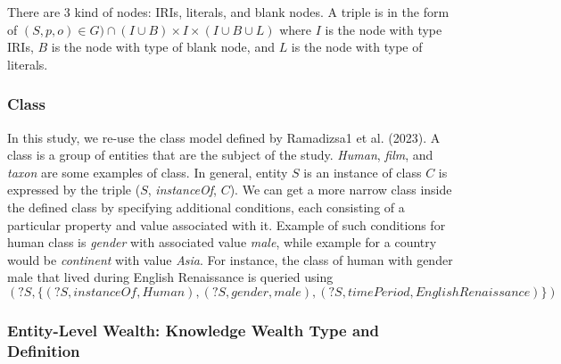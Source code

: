 \documentclass[
]{ceurart}
\begin{document}
There are 3 kind of nodes: IRIs, literals, and blank nodes. A triple is in the form of \((S, p, o) \in G) \cap (I \cup B) \times I \times (I \cup B \cup L) \) where \(I\) is the node with type IRIs, \(B\) is the node with type of blank node, and \(L\) is the node with type of literals.

\subsubsection{Class}
In this study, we re-use the class model defined by Ramadizsa1 et al. (2023). A class is a group of entities that are the subject of the study. \textit{Human}, \textit{film}, and \textit{taxon} are some examples of class. In general, entity \(S\) is an instance of class \(C\) is expressed by the triple (\(S\), \textit{instanceOf}, \(C\)). We can get a more narrow class inside the defined class by specifying additional conditions, each consisting of a particular property and value associated with it. Example of such conditions for human class is \textit{gender} with associated value \textit{male}, while example for a country would be \textit{continent} with value \textit{Asia}. For instance, the class of human with gender male that lived during English Renaissance is queried using
\[
    (?S, \{(?S, instanceOf, Human), (?S, gender, male), (?S, timePeriod, EnglishRenaissance)\})
\]

\subsubsection{Entity-Level Wealth: Knowledge Wealth Type and Definition}
\end{document}
